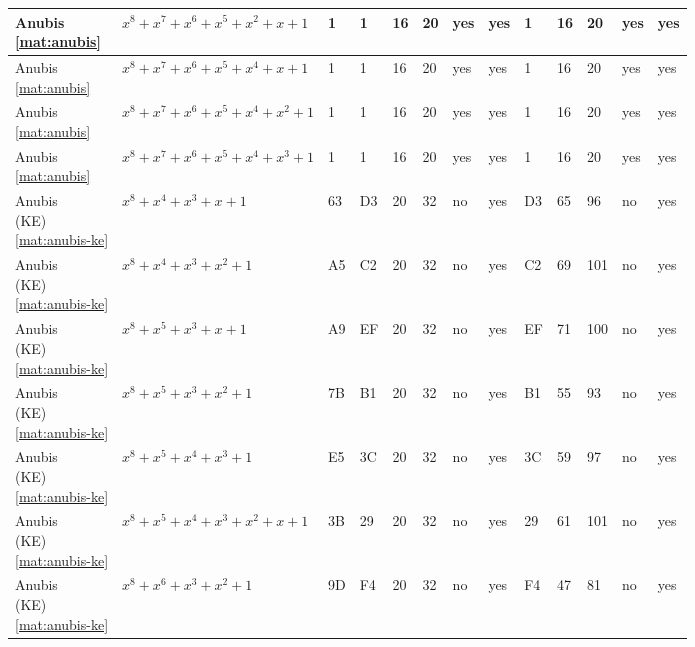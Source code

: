 \begin{tiny}
\begin{longtable}{|l|l|l|l|l|l|l|l|l|l|l|l|l|}
\shortstack{Anubis \\ \eqref{mat:anubis}} & $x^8 + x^7 + x^6 + x^5 + x^2 + x + 1$ & 1 & 1 & 16 & 20 & yes & yes & 1 & 16 & 20 & yes & yes \\ \hline
\shortstack{Anubis \\ \eqref{mat:anubis}} & $x^8 + x^7 + x^6 + x^5 + x^4 + x + 1$ & 1 & 1 & 16 & 20 & yes & yes & 1 & 16 & 20 & yes & yes \\ \hline
\shortstack{Anubis \\ \eqref{mat:anubis}} & $x^8 + x^7 + x^6 + x^5 + x^4 + x^2 + 1$ & 1 & 1 & 16 & 20 & yes & yes & 1 & 16 & 20 & yes & yes \\ \hline
\shortstack{Anubis \\ \eqref{mat:anubis}} & $x^8 + x^7 + x^6 + x^5 + x^4 + x^3 + 1$ & 1 & 1 & 16 & 20 & yes & yes & 1 & 16 & 20 & yes & yes \\ \hline
\shortstack{Anubis \\ (KE) \\ \eqref{mat:anubis-ke}} & $x^8 + x^4 + x^3 + x + 1$ & 63 & D3 & 20 & 32 & no & yes & D3 & 65 & 96 & no & yes \\ \hline
\shortstack{Anubis \\ (KE) \\ \eqref{mat:anubis-ke}} & $x^8 + x^4 + x^3 + x^2 + 1$ & A5 & C2 & 20 & 32 & no & yes & C2 & 69 & 101 & no & yes \\ \hline
\shortstack{Anubis \\ (KE) \\ \eqref{mat:anubis-ke}} & $x^8 + x^5 + x^3 + x + 1$ & A9 & EF & 20 & 32 & no & yes & EF & 71 & 100 & no & yes \\ \hline
\shortstack{Anubis \\ (KE) \\ \eqref{mat:anubis-ke}} & $x^8 + x^5 + x^3 + x^2 + 1$ & 7B & B1 & 20 & 32 & no & yes & B1 & 55 & 93 & no & yes \\ \hline
\shortstack{Anubis \\ (KE) \\ \eqref{mat:anubis-ke}} & $x^8 + x^5 + x^4 + x^3 + 1$ & E5 & 3C & 20 & 32 & no & yes & 3C & 59 & 97 & no & yes \\ \hline
\shortstack{Anubis \\ (KE) \\ \eqref{mat:anubis-ke}} & $x^8 + x^5 + x^4 + x^3 + x^2 + x + 1$ & 3B & 29 & 20 & 32 & no & yes & 29 & 61 & 101 & no & yes \\ \hline
\shortstack{Anubis \\ (KE) \\ \eqref{mat:anubis-ke}} & $x^8 + x^6 + x^3 + x^2 + 1$ & 9D & F4 & 20 & 32 & no & yes & F4 & 47 & 81 & no & yes \\ \hline

\end{longtable}
\end{tiny}
